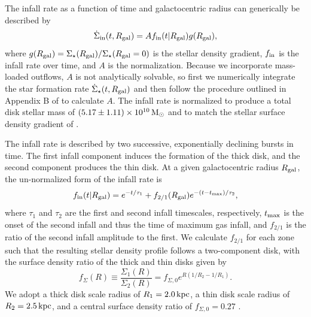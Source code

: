 \documentclass[twocolumn,twocolappendix,linenumbers]{aastex631}
\begin{document}
The infall rate as a function of time and galactocentric radius can generically be described by
\begin{equation}
    \label{eq:infall-rate}
    \dot\Sigma_{\rm in}(t,R_{\rm gal}) = A f_{\rm in}(t|R_{\rm gal}) g(R_{\rm gal}),
\end{equation}
where $g(R_{\rm gal})=\Sigma_\star(R_{\rm gal}) / \Sigma_\star(R_{\rm gal}=0)$ is the stellar density gradient, $f_{\rm in}$ is the infall rate over time, and $A$ is the normalization. Because we incorporate mass-loaded outflows, $A$ is not analytically solvable, so first we numerically integrate the star formation rate $\dot\Sigma_\star(t,R_{\rm gal})$ and then follow the procedure outlined in Appendix B of \citet{johnson_stellar_2021} to calculate $A$. The infall rate is normalized to produce a total disk stellar mass of $(5.17\pm1.11)\times 10^{10}\,{\rm M}_\odot$ \citep{licquia_improved_2015} and to match the stellar surface density gradient of \citet{bland-hawthorn_galaxy_2016}.

The infall rate is described by two successive, exponentially declining bursts in time. The first infall component induces the formation of the thick disk, and the second component produces the thin disk. At a given galactocentric radius $R_{\rm gal}$, the un-normalized form of the infall rate is
\begin{equation}
    \label{eq:twoinfall-ifr}
    f_{\rm in}(t|R_{\rm gal}) = e^{-t/\tau_1} + f_{2/1}(R_{\rm gal}) e^{-(t-t_{\rm max})/\tau_2},
\end{equation}
where $\tau_1$ and $\tau_2$ are the first and second infall timescales, respectively, $t_{\rm max}$ is the onset of the second infall and thus the time of maximum gas infall, and $f_{2/1}$ is the ratio of the second infall amplitude to the first. We calculate $f_{2/1}$ for each zone such that the resulting stellar density profile follows a two-component disk, with the surface density ratio of the thick and thin disks given by
\begin{equation}
    f_\Sigma(R) \equiv \frac{\Sigma_1(R)}{\Sigma_2(R)} = f_{\Sigma,0} e^{R(1/R_2 - 1/R_1)}.
\end{equation}
We adopt a thick disk scale radius of $R_1=2.0\,{\rm kpc}$, a thin disk scale radius of $R_2=2.5\,{\rm kpc}$, and a central surface density ratio of $f_{\Sigma,0}=0.27$ \citep{bland-hawthorn_galaxy_2016}.
\end{document}
